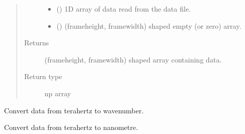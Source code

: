 \documentclass[a4paper,10pt,english]{sphinxmanual}
\begin{document}
\begin{fulllineitems}
\begin{fulllineitems}
\begin{quote}
\begin{description}
\begin{itemize}
\item {} 
\sphinxAtStartPar
{} () \textendash{} 1D array of data read from the data file.

\item {} 
\sphinxAtStartPar
{} () \textendash{} (frameheight, framewidth) shaped empty (or zero) array.

\end{itemize}

\item[{Returns}] \leavevmode
\sphinxAtStartPar
{} \textendash{} (frameheight, framewidth) shaped array containing data.

\item[{Return type}] \leavevmode
\sphinxAtStartPar
np array

\end{description}\end{quote}

\end{fulllineitems}


\begin{fulllineitems}
\label{\detokenize{sfgtools:sfgtools.SFGProcessTools.thz_to_cm}}
\sphinxAtStartPar
Convert data from terahertz to wavenumber.

\end{fulllineitems}


\begin{fulllineitems}
\label{\detokenize{sfgtools:sfgtools.SFGProcessTools.thz_to_nm}}
\sphinxAtStartPar
Convert data from terahertz to nanometre.

\end{fulllineitems}



\end{fulllineitems}
\end{document}
